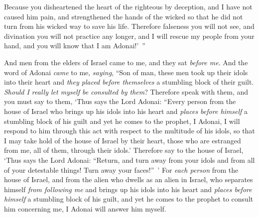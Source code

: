 \begin{biblechapter}
\verse Because you disheartened the heart of the righteous by deception, and I have not caused him pain, and strengthened the hands of the wicked so that he did not turn from his wicked way to save his life.
\verse Therefore falseness you will not see, and divination you will not practice any longer, and I will rescue my people from your hand, and you will know that I am Adonai!’ ”
\end{biblechapter}

\begin{biblechapter} %
 And men from the elders of Israel came to me, and they sat \textit{before me}.
\verse And the word of Adonai \textit{came} to me, \textit{saying},
\verse “Son of man, these men took up their idols into their heart and \textit{they placed before themselves} a stumbling block of their guilt. \textit{Should I really let myself be consulted by them}?
\verse Therefore speak with them, and you must say to them, ‘Thus says the Lord Adonai: “Every person from the house of Israel who brings up his idols into his heart and \textit{places before himself} a stumbling block of his guilt and yet he comes to the prophet, I Adonai, I will respond to him through this act with respect to the multitude of his idols,
\verse so that I may take hold of the house of Israel by their heart, those who are estranged from me, all of them, through their idols.’
\verse Therefore say to the house of Israel, ‘Thus says the Lord Adonai: “Return, and turn away from your idols and from all of your detestable things! Turn away your faces!” ’
\verse For \textit{each person} from the house of Israel, and from the alien who dwells as an alien in Israel, who separates himself \textit{from following me} and brings up his idols into his heart and \textit{places before himself} a stumbling block of his guilt, and yet he comes to the prophet to consult him concerning me, I Adonai will answer him myself.

\end{biblechapter}
